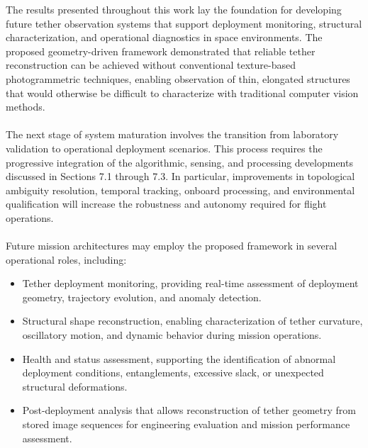 The results presented throughout this work lay the foundation for developing future tether observation systems that support deployment monitoring, structural characterization, and operational diagnostics in space environments. The proposed geometry-driven framework demonstrated that reliable tether reconstruction can be achieved without conventional texture-based photogrammetric techniques, enabling observation of thin, elongated structures that would otherwise be difficult to characterize with traditional computer vision methods.
\\\\
The next stage of system maturation involves the transition from laboratory validation to operational deployment scenarios. This process requires the progressive integration of the algorithmic, sensing, and processing developments discussed in Sections 7.1 through 7.3. In particular, improvements in topological ambiguity resolution, temporal tracking, onboard processing, and environmental qualification will increase the robustness and autonomy required for flight operations.
\\\\
Future mission architectures may employ the proposed framework in several operational roles, including:

\begin{itemize}
    \item Tether deployment monitoring, providing real-time assessment of deployment geometry, trajectory evolution, and anomaly detection.
    \item Structural shape reconstruction, enabling characterization of tether curvature, oscillatory motion, and dynamic behavior during mission operations.
    \item Health and status assessment, supporting the identification of abnormal deployment conditions, entanglements, excessive slack, or unexpected structural deformations.
    \item Post-deployment analysis that allows reconstruction of tether geometry from stored image sequences for engineering evaluation and mission performance assessment.
\end{itemize}


